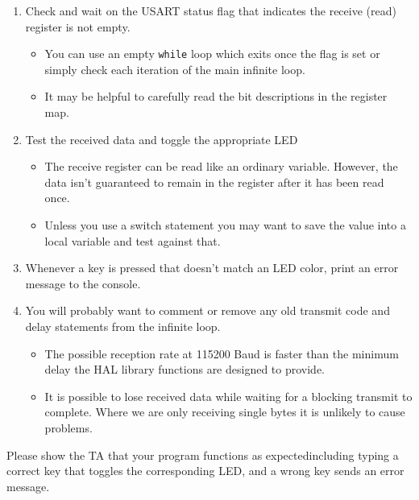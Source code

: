 \documentclass[openany,11pt,fleqn]{book} %
\begin{document}
\begin{exercise}
	\begin{enumerate}
	    \item Check and wait on the USART status flag that indicates the receive (read) register is not empty.
	    \begin{itemize}
	        \item You can use an empty \texttt{while} loop which exits once the flag is set or simply check each iteration of the main infinite loop. 
	        \item It may be helpful to carefully read the bit descriptions in the register map.
	    \end{itemize}
	    \item Test the received data and toggle the appropriate LED
	    \begin{itemize}
	        \item The receive register can be read like an ordinary variable. However, the data isn't guaranteed to remain in the register after it has been read once. 
	        \item Unless you use a switch statement you may want to save the value into a local variable and test against that. 
	    \end{itemize}
	    \item Whenever a key is pressed that doesn't match an LED color, print an error message to the console. 
	    \item You will probably want to comment or remove any old transmit code and delay statements from the infinite loop. 
	    \begin{itemize}
	        \item The possible reception rate at 115200 Baud is faster than the minimum delay the HAL library functions are designed to provide. 
	        \item It is possible to lose received data while waiting for a blocking transmit to complete. Where we are only receiving single bytes it is unlikely to cause problems.
	    \end{itemize}
	\end{enumerate}
\end{exercise}

\begin{assignment}
	Please show the TA that your program functions as expected\textemdash including typing a correct key that toggles the corresponding LED, and a wrong key sends an error message.
\end{assignment}
\end{document}
